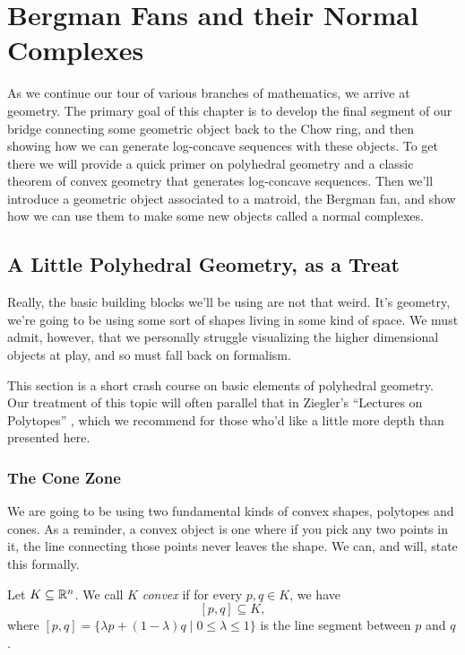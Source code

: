 \documentclass[12pt,oneside]{../../sfsuthesis}
\begin{document}
\chapter{Bergman Fans and their Normal Complexes}
As we continue our tour of various branches of mathematics, we arrive at geometry.
The primary goal of this chapter is to develop the final segment of our bridge connecting some geometric object back to the Chow ring, and then showing how we can generate log-concave sequences with these objects.
To get there we will provide a quick primer on polyhedral geometry and a classic theorem of convex geometry that generates log-concave sequences.
Then we'll introduce a geometric object associated to a matroid, the Bergman fan, and show how we can use them to make some new objects called a normal complexes.

\section{A Little Polyhedral Geometry, as a Treat}
Really, the basic building blocks we'll be using are not that weird.
It's geometry, we're going to be using some sort of shapes living in some kind of space.
We must admit, however, that we personally struggle visualizing the higher dimensional objects at play, and so must fall back on formalism.

This section is a short crash course on basic elements of polyhedral geometry.
Our treatment of this topic will often parallel that in Ziegler's ``Lectures on Polytopes'' \cite{zieglerLecturesPolytopes1995}, which we recommend for those who'd like a little more depth than presented here.

\subsection{The Cone Zone}
We are going to be using two fundamental kinds of convex shapes, polytopes and cones.
As a reminder, a convex object is one where if you pick any two points in it, the line connecting those points never leaves the shape.
We can, and will, state this formally.
\begin{definition}[Convexity]\label{def:convex}
    Let \( K \subseteq \mathbb{R}^n \).
    We call \( K \) \emph{convex} if for every \( p, q \in K \), we have
    \[
        [p, q] \subseteq K,
    \]
    where \( [p, q] = \{ \lambda p + (1 - \lambda) q \; | \; 0 \leq \lambda \leq 1 \} \) is the line segment between \( p \) and \( q \).
\end{definition}
\end{document}
